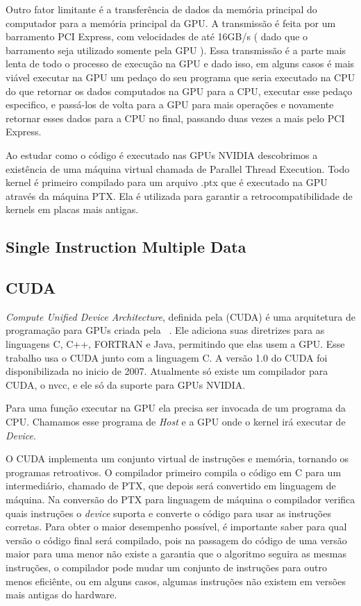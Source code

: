 Outro fator limitante é a transferência de dados da memória principal do computador para a memória 
principal da GPU. A transmissão é feita por um barramento PCI Express, com velocidades de até 16GB/s ( dado que o
barramento seja utilizado somente pela GPU ). Essa transmissão é a parte mais lenta de todo o
processo de execução na GPU e dado isso, em alguns casos é mais viável executar na GPU um pedaço do seu programa que seria executado
na CPU do que retornar os dados computados na GPU para a CPU, executar esse pedaço especifico, e passá-los de volta para a GPU 
para mais operações e novamente retornar esses dados para a CPU no final, passando duas vezes a mais pelo PCI Express. 

Ao estudar como o código é executado nas GPUs NVIDIA descobrimos a existência de uma máquina virtual chamada de Parallel Thread Execution\cite{ptx}.
Todo kernel é primeiro compilado para um arquivo .ptx que é executado na GPU através da máquina PTX. Ela é utilizada para garantir 
a retrocompatibilidade de kernels em placas mais antigas.
\subsection{Single Instruction Multiple Data}

\subsection{CUDA}
\textit{Compute Unified Device Architecture}, definida pela (CUDA) é uma arquitetura de programação para GPUs criada 
pela ~\cite{nvidia2007compute}.
Ele adiciona suas diretrizes para as linguagens C, C++, FORTRAN e Java, permitindo que elas usem a GPU.
Esse trabalho usa o CUDA junto com a linguagem C.
A versão 1.0 do CUDA foi disponibilizada no inicio de 2007. Atualmente só existe um compilador para CUDA, o nvcc,
e ele só da suporte para GPUs NVIDIA.

Para uma função executar na GPU ela precisa ser invocada de um programa da CPU. Chamamos esse programa de \textit{Host}
e a GPU onde o kernel irá executar de \textit{Device}.

O CUDA implementa um conjunto virtual de instruções e memória, tornando os programas retroativos. O compilador
primeiro compila o código em C para um intermediário, chamado de PTX, que depois será convertido em linguagem
de máquina. Na conversão do PTX para linguagem de máquina o compilador verifica quais instruções o \textit{device}
suporta e converte o código para usar as instruções corretas.
Para obter o maior desempenho possível, é importante saber para qual versão o código final será compilado, 
pois na passagem do código de uma versão maior para uma menor não existe a garantia que o algoritmo seguira as mesmas instruções, 
o compilador pode mudar um conjunto de instruções para outro menos eficiênte, ou em alguns casos, algumas instruções não existem em
versões mais antigas do hardware.

